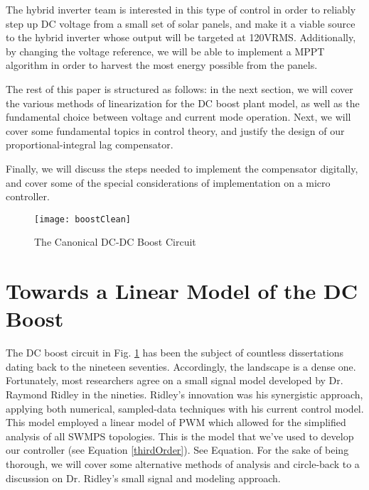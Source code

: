 The hybrid inverter team is interested in this type of control in order to reliably step up DC voltage from a small set of solar panels, and make it a viable source to the hybrid inverter whose output will be targeted at 120VRMS.
Additionally, by changing the voltage reference, we will be able to implement a MPPT algorithm in order to harvest the most energy possible from the panels.

The rest of this paper is structured as follows: in the next section, we will cover the various methods of linearization for the DC boost plant model, as well as the fundamental choice between voltage and current mode operation. Next, we will cover some fundamental topics in control theory, and justify the design of our proportional-integral lag compensator. 

Finally, we will discuss the steps needed to implement the compensator digitally, and cover some of the special considerations of implementation on a micro controller.  

\begin{figure}[htbp]
\begin{center}
\texttt{[image: boostClean]}
\caption{The Canonical DC-DC Boost Circuit}
\label{boost}
\end{center}
\end{figure}


\section{Towards a Linear Model of the DC Boost}

The DC boost circuit in Fig. \ref{boost} has been the subject of countless dissertations dating back to the nineteen seventies. Accordingly, the landscape is a dense one. Fortunately, most researchers agree on a small signal model developed by Dr. Raymond Ridley in the nineties. Ridley's innovation was his synergistic approach, applying both numerical, sampled-data techniques with his current control model. This model employed a linear model of PWM which allowed for the simplified analysis of all SWMPS topologies. This is the model that we've used to develop our controller (see Equation \ref{thirdOrder}). See Equation. For the sake of being thorough, we will cover some alternative methods of analysis and circle-back to a discussion on Dr. Ridley's small signal and modeling approach.

